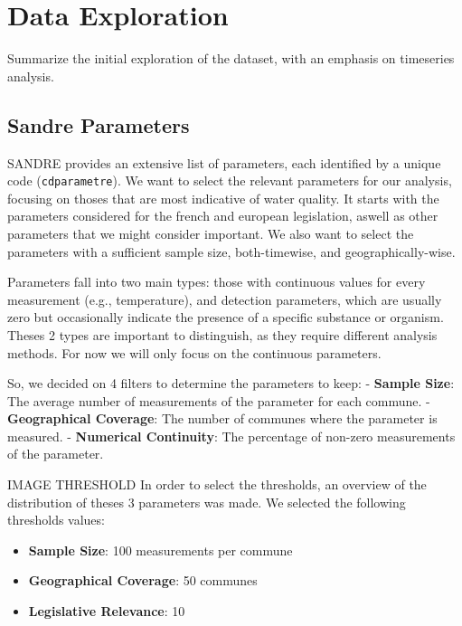 \documentclass{article}
\begin{document}
\section{Data Exploration}
Summarize the initial exploration of the dataset, with an emphasis on timeseries analysis.
\subsection{Sandre Parameters}
SANDRE provides an extensive list of parameters, each identified by a unique code (\texttt{cdparametre}).
We want to select the relevant parameters for our analysis, focusing on thoses that are most indicative of water quality.
It starts with the parameters considered for the french and european legislation, aswell as other parameters that we might consider important.
We also want to select the parameters with a sufficient sample size, both-timewise, and geographically-wise.

Parameters fall into two main types: those with continuous values for every measurement (e.g., temperature), 
and detection parameters, which are usually zero but occasionally indicate the presence of a specific substance or organism.
Theses 2 types are important to distinguish, as they require different analysis methods. For now we will only focus on the continuous parameters.



So, we decided on 4 filters to determine the parameters to keep:
- \textbf{Sample Size}: The average number of measurements of the parameter for each commune.
- \textbf{Geographical Coverage}: The number of communes where the parameter is measured.
- \textbf{Numerical Continuity}: The percentage of non-zero measurements of the parameter.

IMAGE THRESHOLD
In order to select the thresholds, an overview of the distribution of theses 3 parameters was made.
We selected the following thresholds values:
\begin{itemize}
    \item \textbf{Sample Size}: 100 measurements per commune
    \item \textbf{Geographical Coverage}: 50 communes
    \item \textbf{Legislative Relevance}: 10%
\end{itemize}
\end{document}
